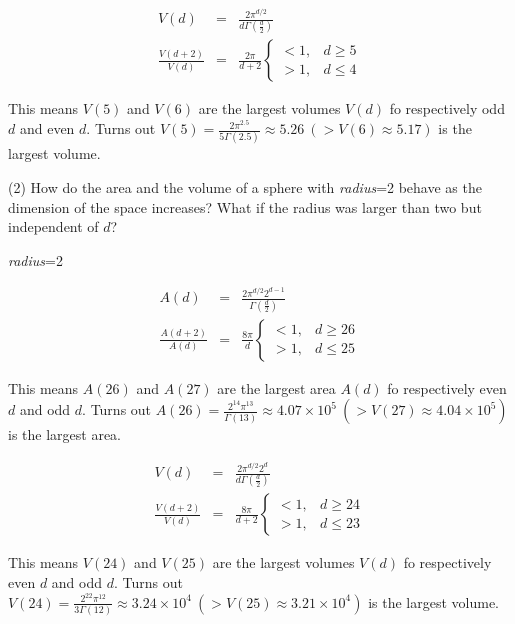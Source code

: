 \begin{sloppypar}
\begin{eqnarray*}
    V(d)&=&\frac{2\pi^{d/2}}{d\Gamma(\frac{d}{2})}\\
    \frac{V(d+2)}{V(d)}&=&\frac{2\pi }{d+2}\left\{
    \begin{array}{rl}
        <1, & d\geq 5\\
        >1, & d\leq 4
    \end{array}\right.
\end{eqnarray*}

This means $V(5)$ and $V(6)$ are the largest volumes $V(d)$ fo respectively odd $d$ and even $d$. Turns out $V(5)=\frac{2\pi^{2.5}}{5\Gamma(2.5)}\approx 5.26~(>V(6)\approx 5.17)$ is the largest volume. \par

(2) How do the area and the volume of a sphere with \textit{radius}=2 behave as the dimension of the space increases? What if the radius was larger than two but independent of $d$?\par
\textit{radius}=2

\begin{eqnarray*}
    A(d)&=&\frac{2\pi^{d/2}2^{d-1}}{\Gamma(\frac{d}{2})}\\
    \frac{A(d+2)}{A(d)}&=&\frac{8\pi}{d}\left\{
    \begin{array}{rl}
        <1, & d\geq 26\\
        >1, & d\leq 25
    \end{array}\right.
\end{eqnarray*}

This means $A(26)$ and $A(27)$ are the largest area $A(d)$ fo respectively even $d$ and odd $d$. Turns out $A(26)=\frac{2^14\pi^{13}}{\Gamma(13)}\approx 4.07\times 10^5~(>V(27)\approx 4.04\times 10^5)$ is the largest area. \par
\begin{eqnarray*}
    V(d)&=&\frac{2\pi^{d/2}2^d}{d\Gamma(\frac{d}{2})}\\
    \frac{V(d+2)}{V(d)}&=&\frac{8\pi}{d+2}\left\{
    \begin{array}{rl}
        <1, & d\geq 24\\
        >1, & d\leq 23
    \end{array}\right.
\end{eqnarray*}

This means $V(24)$ and $V(25)$ are the largest volumes $V(d)$ fo respectively even $d$ and odd $d$. Turns out $V(24)=\frac{2^22\pi^{12}}{3\Gamma(12)}\approx 3.24\times 10^4~(>V(25)\approx 3.21\times 10^4)$ is the largest volume.


\end{sloppypar}
